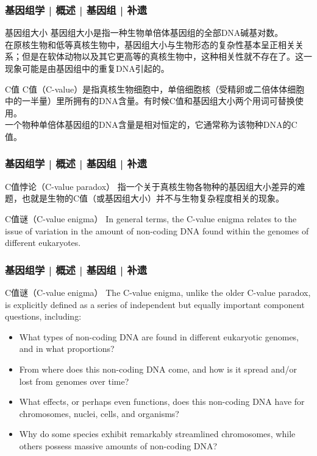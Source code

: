 \begin{frame}
  \frametitle{基因组学 | 概述 | 基因组 | 补遗}
  \begin{block}{基因组大小}
基因组大小是指一种生物单倍体基因组的全部DNA碱基对数。\\
\vspace{1em}
在原核生物和低等真核生物中，基因组大小与生物形态的复杂性基本呈正相关关系；但是在软体动物以及其它更高等的真核生物中，这种相关性就不存在了。这一现象可能是由基因组中的重复DNA引起的。 
  \end{block}
  \pause
  \begin{block}{C值}
C值（C-value）是指真核生物细胞中，单倍细胞核（受精卵或二倍体体细胞中的一半量）里所拥有的DNA含量。有时候C值和基因组大小两个用词可替换使用。\\
\vspace{1em}
一个物种单倍体基因组的DNA含量是相对恒定的，它通常称为该物种DNA的C值。
  \end{block}
\end{frame}

\begin{frame}
  \frametitle{基因组学 | 概述 | 基因组 | 补遗}
  \begin{block}{C值悖论（C-value paradox）}
指一个关于真核生物各物种的基因组大小差异的难题，也就是生物的C值（或基因组大小）并不与生物复杂程度相关的现象。
  \end{block}
  \pause
  \begin{block}{C值谜（C-value enigma）}
In general terms, the C-value enigma relates to the issue of variation in the amount of non-coding DNA found within the genomes of different eukaryotes.\\
  \end{block}
\end{frame}

\begin{frame}
  \frametitle{基因组学 | 概述 | 基因组 | 补遗}
  \begin{block}{C值谜（C-value enigma）}
The C-value enigma, unlike the older C-value paradox, is explicitly defined as a series of independent but equally important component questions, including:
\begin{itemize}
  \item What types of non-coding DNA are found in different eukaryotic genomes, and in what proportions?
  \item From where does this non-coding DNA come, and how is it spread and/or lost from genomes over time?
  \item What effects, or perhaps even functions, does this non-coding DNA have for chromosomes, nuclei, cells, and organisms?
  \item Why do some species exhibit remarkably streamlined chromosomes, while others possess massive amounts of non-coding DNA?
\end{itemize}
  \end{block}
\end{frame}


